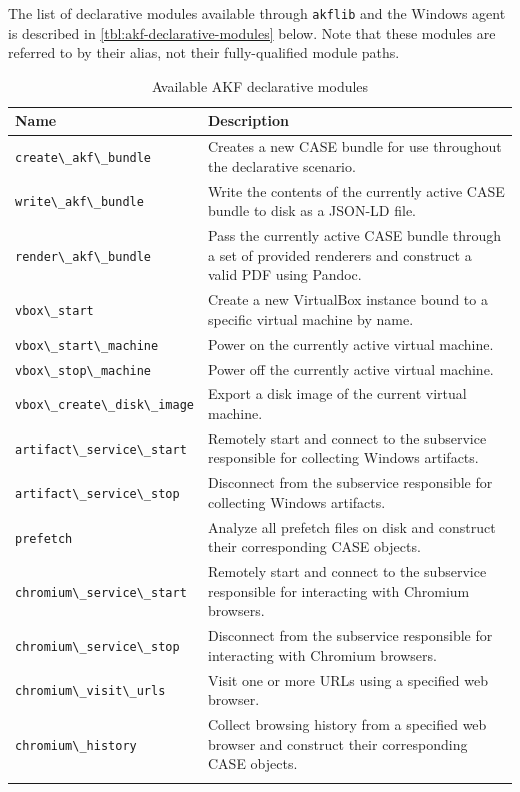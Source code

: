 \documentclass[final,5p,times,twocolumn]{elsarticle}
\newcommand{\passthrough}[1]{#1}
\begin{document}
The list of declarative modules available through
\passthrough{\lstinline!akflib!} and the Windows agent is described in
\autoref{tbl:akf-declarative-modules} below. Note that these modules are
referred to by their alias, not their fully-qualified module paths.


\begin{table}[tb]
\footnotesize
\centering
\begin{tabularx}{\linewidth}{L{0.3} L{0.7}}
\toprule
  \textbf{Name} & \textbf{Description} \\
\midrule
  \passthrough{\lstinline!create\_akf\_bundle!} & Creates a new CASE
  bundle for use throughout the declarative scenario. \\
  \passthrough{\lstinline!write\_akf\_bundle!} & Write the contents of the
  currently active CASE bundle to disk as a JSON-LD file. \\
  \passthrough{\lstinline!render\_akf\_bundle!} & Pass the currently
  active CASE bundle through a set of provided renderers and construct a
  valid PDF using Pandoc. \\
  \passthrough{\lstinline!vbox\_start!} & Create a new VirtualBox instance
  bound to a specific virtual machine by name. \\
  \passthrough{\lstinline!vbox\_start\_machine!} & Power on the currently
  active virtual machine. \\
  \passthrough{\lstinline!vbox\_stop\_machine!} & Power off the currently
  active virtual machine. \\
  \passthrough{\lstinline!vbox\_create\_disk\_image!} & Export a disk
  image of the current virtual machine. \\
  \passthrough{\lstinline!artifact\_service\_start!} & Remotely start and
  connect to the subservice responsible for collecting Windows
  artifacts. \\
  \passthrough{\lstinline!artifact\_service\_stop!} & Disconnect from the
  subservice responsible for collecting Windows artifacts. \\
  \passthrough{\lstinline!prefetch!} & Analyze all prefetch files on disk
  and construct their corresponding CASE objects. \\
  \passthrough{\lstinline!chromium\_service\_start!} & Remotely start and
  connect to the subservice responsible for interacting with Chromium
  browsers. \\
  \passthrough{\lstinline!chromium\_service\_stop!} & Disconnect from the
  subservice responsible for interacting with Chromium browsers. \\
  \passthrough{\lstinline!chromium\_visit\_urls!} & Visit one or more URLs
  using a specified web browser. \\
  \passthrough{\lstinline!chromium\_history!} & Collect browsing history
  from a specified web browser and construct their corresponding CASE
  objects. \\ \\
\bottomrule
\end{tabularx}
\caption{Available AKF declarative modules}\label{tbl:akf-declarative-modules}
\end{table}
\end{document}
